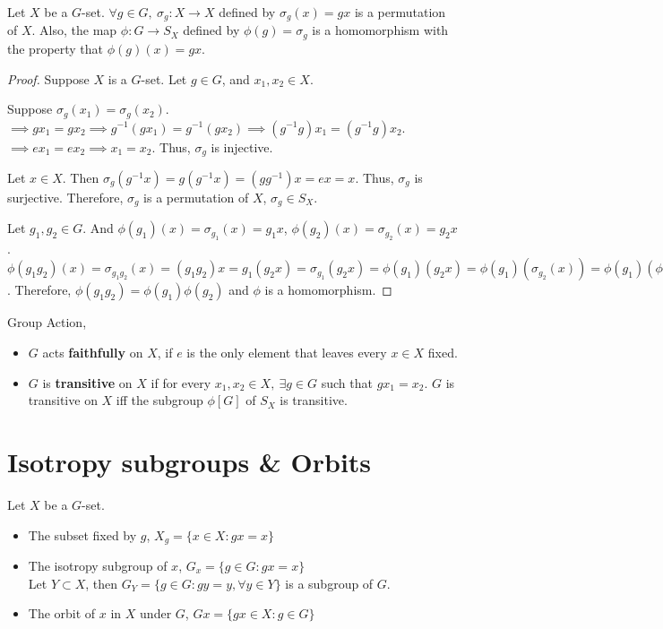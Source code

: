 \begin{theorem}
	Let $X$ be a $G$-set.
	$\forall g \in G,\ \sigma_g : X \to X$ defined by $\sigma_g(x) = gx$ is a permutation of $X$.
	Also, the map $\phi : G \to S_X$ defined by $\phi(g) = \sigma_g$ is a homomorphism with the property that $\phi(g)(x) = gx$.
\end{theorem}
\begin{proof}
	Suppose $X$ is a $G$-set.
	Let $g \in G$, and $x_1,x_2 \in X$.

	Suppose $\sigma_g(x_1) = \sigma_g(x_2)$. $\implies gx_1 = gx_2 \implies g^{-1}(gx_1) = g^{-1}(gx_2) \implies (g^{-1}g)x_1 = (g^{-1}g)x_2$. $\implies ex_1 = ex_2 \implies x_1 = x_2$. Thus, $\sigma_g$ is injective.

	Let $x \in X$. Then $\sigma_g(g^{-1}x) = g(g^{-1}x) = (gg^{-1})x = ex = x$. Thus, $\sigma_g$ is surjective. Therefore, $\sigma_g$ is a permutation of $X$, $\sigma_g \in S_X$.

	Let $g_1,g_2 \in G$.
	And $\phi(g_1)(x) = \sigma_{g_1}(x) = g_1x$, $\phi(g_2)(x) = \sigma_{g_2}(x) = g_2x$.
	$\phi(g_1g_2)(x) = \sigma_{g_1g_2}(x) = (g_1g_2)x = g_1(g_2x) = \sigma_{g_1}(g_2x) = \phi(g_1)(g_2x) = \phi(g_1)(\sigma_{g_2}(x)) = \phi(g_1)(\phi(g_2)(x)) = \phi(g_1)\phi(g_2)(x)$.
	Therefore, $\phi(g_1g_2) = \phi(g_1)\phi(g_2)$ and $\phi$ is a homomorphism.
\end{proof}

\begin{definition}Group Action,
\begin{itemize}
	\item $G$ acts \textbf{faithfully} on $X$, if $e$ is the only element that leaves every $x \in X$ fixed. 
	\item $G$ is \textbf{transitive} on $X$ if for every $x_1,x_2 \in X,\ \exists g \in G$ such that $gx_1 = x_2$.
	$G$ is transitive on $X$ iff the subgroup $\phi[G]$ of $S_X$ is transitive.
\end{itemize}
\end{definition}

\section{Isotropy subgroups \& Orbits}
\begin{definition}Let $X$ be a $G$-set.
\begin{itemize}
	\item The subset fixed by $g$, $X_g = \{ x \in X : gx = x \}$
	\item The isotropy subgroup of $x$, $G_x = \{ g \in G : gx = x \}$\\
		Let $Y \subset X$, then $G_Y = \{ g \in G : gy = y, \forall y \in Y \}$ is a subgroup of $G$. %
	\item The orbit of $x$ in $X$ under $G$, $Gx = \{ gx \in X : g \in G \}$
\end{itemize}
\end{definition}

